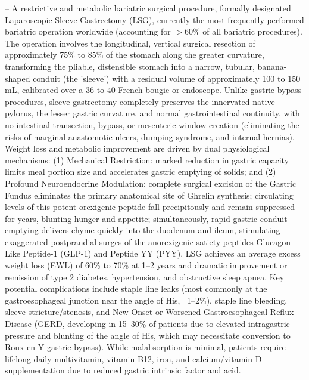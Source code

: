 -- A restrictive and metabolic bariatric surgical procedure, formally designated Laparoscopic Sleeve Gastrectomy (LSG), currently the most frequently performed bariatric operation worldwide (accounting for $>60\%$ of all bariatric procedures). The operation involves the longitudinal, vertical surgical resection of approximately 75\% to 85\% of the stomach along the greater curvature, transforming the pliable, distensible stomach into a narrow, tubular, banana-shaped conduit (the 'sleeve') with a residual volume of approximately 100 to 150 mL, calibrated over a 36-to-40 French bougie or endoscope. Unlike gastric bypass procedures, sleeve gastrectomy completely preserves the innervated native pylorus, the lesser gastric curvature, and normal gastrointestinal continuity, with no intestinal transection, bypass, or mesenteric window creation (eliminating the risks of marginal anastomotic ulcers, dumping syndrome, and internal hernias). Weight loss and metabolic improvement are driven by dual physiological mechanisms: (1) Mechanical Restriction: marked reduction in gastric capacity limits meal portion size and accelerates gastric emptying of solids; and (2) Profound Neuroendocrine Modulation: complete surgical excision of the Gastric Fundus eliminates the primary anatomical site of Ghrelin synthesis; circulating levels of this potent orexigenic peptide fall precipitously and remain suppressed for years, blunting hunger and appetite; simultaneously, rapid gastric conduit emptying delivers chyme quickly into the duodenum and ileum, stimulating exaggerated postprandial surges of the anorexigenic satiety peptides Glucagon-Like Peptide-1 (GLP-1) and Peptide YY (PYY). LSG achieves an average excess weight loss (EWL) of 60\% to 70\% at 1--2 years and dramatic improvement or remission of type 2 diabetes, hypertension, and obstructive sleep apnea. Key potential complications include staple line leaks (most commonly at the gastroesophageal junction near the angle of His, ~1--2\%), staple line bleeding, sleeve stricture/stenosis, and New-Onset or Worsened Gastroesophageal Reflux Disease (GERD, developing in 15--30\% of patients due to elevated intragastric pressure and blunting of the angle of His, which may necessitate conversion to Roux-en-Y gastric bypass). While malabsorption is minimal, patients require lifelong daily multivitamin, vitamin B12, iron, and calcium/vitamin D supplementation due to reduced gastric intrinsic factor and acid.

